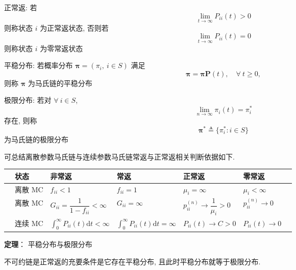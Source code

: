 \documentclass[openany]{ctexbook}
\theoremstyle{kaiti}
\theoremstyle{normal}
\begin{document}
正常返: 若
\begin{equation}
  \lim_{t\to\infty}P_{ii}(t)>0
\end{equation} 则称状态 $i$ 为正常返状态, 否则若
\begin{equation}
  \lim_{t\to\infty}P_{ii}(t)=0
\end{equation} 则称状态 $i$ 为零常返状态

平稳分布: 若概率分布 $\bm{\pi}=(\pi_i,~i\in S)$ 满足
\begin{equation}
  \bm{\pi}=\bm{\pi}\bm{P}(t),\quad\forall~t\geqslant0,
\end{equation} 则称 $\bm{\pi}$ 为马氏链的平稳分布

极限分布: 若对 $\forall~i\in S$, 
\begin{equation}
  \lim_{n\to\infty}\pi_i(t)=\pi_i^*
\end{equation} 存在, 则称
\begin{equation}
  \bm{\pi}^*\triangleq\{\pi_i^*:i\in S\}
\end{equation} 为马氏链的极限分布

可总结离散参数马氏链与连续参数马氏链常返与正常返相关判断依据如下.

\begin{table}[ht]
  \renewcommand\arraystretch{1.5}
  \begin{tabular}{lllllll}
  \hline
   & 状态    & 非常返                                                      & 常返                                                       & 正常返                                 & 零常返                &  \\
   \hline
   & 离散 MC & $f_{ii}<1$                                               & $f_{ii}=1$                                               & $\mu_i=\infty$                      & $\mu_i<\infty$     &  \\
   & 离散 MC & $G_{ii}=\dfrac{1}{1-f_{ii}}<\infty$                      & $G_{ii}=\infty$                                          & $p_{ii}^{(n)}\to\dfrac{1}{\mu_i}>0$ & $p_{ii}^{(n)}\to0$ &  \\
   & 连续 MC & $\displaystyle\int_0^\infty P_{ii}(t)\mathrm{d}t<\infty$ & $\displaystyle\int_0^\infty P_{ii}(t)\mathrm{d}t=\infty$ & $P_{ii}(t)\to C>0$                  & $P_{ii}(t)\to0$    & \\
   \hline
  \end{tabular}
\end{table}

\textbf{定理}： 平稳分布与极限分布

不可约链是正常返的充要条件是它存在平稳分布, 且此时平稳分布就等于极限分布.
\end{document}
